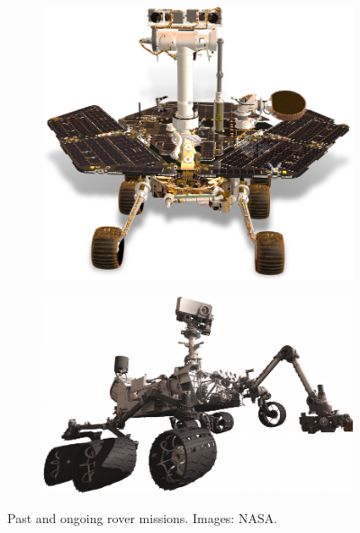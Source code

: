 \begin{figure}[h]
\begin{subfigure}[t]{\subfigureWidth}
        \label{fig:sub:past-mission-rover-sojourner}
	\end{subfigure}\\[0.8ex]
	\begin{subfigure}[t]{\subfigureWidth}
        \centering
		\includegraphics[height=\graphicsHeight]{sections/state-of-the-art/past-and-ongoing-missions/images/rover-mer.png}
		\label{fig:sub:past-mission-rovers-mer}
	\end{subfigure}\hspace*{0.5cm}
    \begin{subfigure}[t]{\subfigureWidth}
        \centering
		\includegraphics[height=\graphicsHeight]{sections/state-of-the-art/past-and-ongoing-missions/images/rover-msl.png}
		\label{fig:sub:past-mission-rovers-msl}
	\end{subfigure}
    \caption[Past and ongoing rover missions]
            {Past and ongoing rover missions. Images: NASA.}
	\label{fig:past-mission-rovers}
\vspace{-2ex}
\end{figure}

